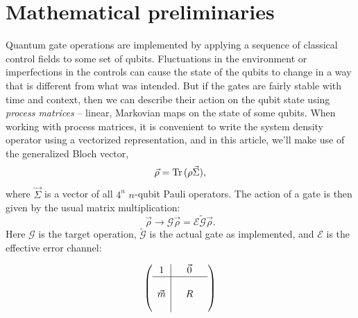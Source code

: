 \documentclass[aps,nofootinbib,pra,notitlepage,twocolumn]{revtex4-1}
\newcommand{\tr}{{\rm Tr\thinspace}}
\newcommand{\actual}{\ensuremath{\tilde{\mathcal{G}}}}
\newcommand{\target}{\ensuremath{{\mathcal{G}}}}
\newcommand{\error}{\ensuremath{{\mathcal{E}}}}
\begin{document}


\section{Mathematical preliminaries}
\label{sec:representing_quantum_gates}
Quantum gate operations are implemented by applying a sequence of classical control fields to some set of qubits. Fluctuations in the environment or imperfections in the controls can cause the state of the qubits to change in a way that is different from what was intended.  But if the gates are fairly stable with time and context\cite{1810.05651}, then we can describe their action on the qubit state using \emph{process matrices} -- linear, Markovian maps on the state of some qubits.  When working with process matrices, it is convenient to write the system density operator using a vectorized representation, and in this article, we'll make use of the generalized Bloch vector,
\begin{equation}
  \vec \rho = \tr(\rho \vec \Sigma),
\end{equation}
where $\vec \Sigma$ is a vector of all $4^n$ $n$-qubit Pauli operators. The action of a gate is then given by the usual matrix multiplication:
\begin{equation}\label{error_def}
  \vec\rho \rightarrow \target\vec\rho = \error \actual \vec\rho.
\end{equation}
Here $\target$ is the target operation, $\actual$ is the actual gate as implemented, and $\error$ is the effective error channel:

\begin{equation}\label{eq:process_matrix}
	\left(\begin{array}{c|cccc}
		1 &  & \vec0 & \\ 
		\hline & &  &  \\
		\vec{m} &  & R &  \\
		 &  &  & 
	\end{array} 	
	\right)
\end{equation}
\end{document}
